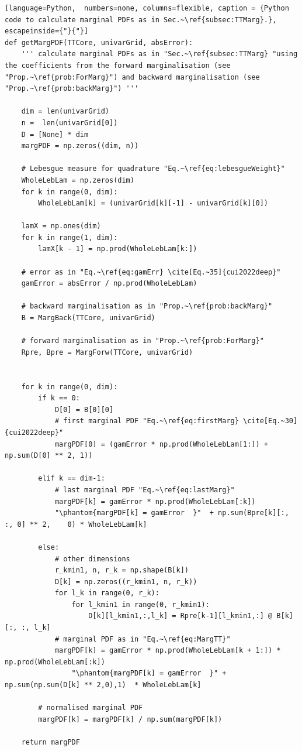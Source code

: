 \clearpage
\begin{lstlisting}[language=Python,	 numbers=none, columns=flexible, caption = {Python code to calculate marginal PDFs as in Sec.~\ref{subsec:TTMarg}.}, escapeinside={"}{"}]
def getMargPDF(TTCore, univarGrid, absError):
	''' calculate marginal PDFs as in "Sec.~\ref{subsec:TTMarg} "using the coefficients from the forward marginalisation (see "Prop.~\ref{prob:ForMarg}") and backward marginalisation (see "Prop.~\ref{prob:backMarg}") '''

	dim = len(univarGrid)
	n =  len(univarGrid[0])
	D = [None] * dim
	margPDF = np.zeros((dim, n))
	
	# Lebesgue measure for quadrature "Eq.~\ref{eq:lebesgueWeight}"
	WholeLebLam = np.zeros(dim)
	for k in range(0, dim):
		WholeLebLam[k] = (univarGrid[k][-1] - univarGrid[k][0])
	
	lamX = np.ones(dim)
	for k in range(1, dim):
		lamX[k - 1] = np.prod(WholeLebLam[k:])
		
	# error as in "Eq.~\ref{eq:gamErr} \cite[Eq.~35]{cui2022deep}"
	gamError = absError / np.prod(WholeLebLam)
	
	# backward marginalisation as in "Prop.~\ref{prob:backMarg}"
	B = MargBack(TTCore, univarGrid)
	
	# forward marginalisation as in "Prop.~\ref{prob:ForMarg}"
	Rpre, Bpre = MargForw(TTCore, univarGrid)
	
	
	for k in range(0, dim):
		if k == 0:
			D[0] = B[0][0]
			# first marginal PDF "Eq.~\ref{eq:firstMarg} \cite[Eq.~30]{cui2022deep}"
			margPDF[0] = (gamError * np.prod(WholeLebLam[1:]) + np.sum(D[0] ** 2, 1))
		
		elif k == dim-1:
			# last marginal PDF "Eq.~\ref{eq:lastMarg}"
			margPDF[k] = gamError * np.prod(WholeLebLam[:k]) 
			"\phantom{margPDF[k] = gamError  }"  + np.sum(Bpre[k][:, :, 0] ** 2, 	0) * WholeLebLam[k]
		
		else:
			# other dimensions
			r_kmin1, n, r_k = np.shape(B[k])
			D[k] = np.zeros((r_kmin1, n, r_k))
			for l_k in range(0, r_k):
				for l_kmin1 in range(0, r_kmin1):
					D[k][l_kmin1,:,l_k] = Rpre[k-1][l_kmin1,:] @ B[k][:, :, l_k]
			# marginal PDF as in "Eq.~\ref{eq:MargTT}"
			margPDF[k] = gamError * np.prod(WholeLebLam[k + 1:]) * np.prod(WholeLebLam[:k]) 
				"\phantom{margPDF[k] = gamError  }" + np.sum(np.sum(D[k] ** 2,0),1)  * WholeLebLam[k]
		
		# normalised marginal PDF
		margPDF[k] = margPDF[k] / np.sum(margPDF[k])
		
	return margPDF
\end{lstlisting}
